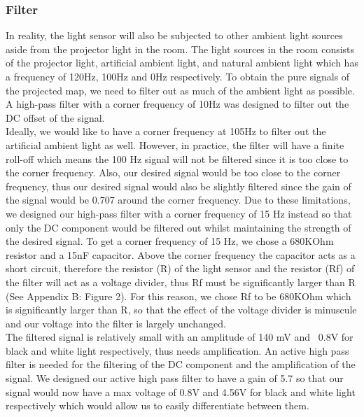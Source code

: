 \subsubsection*{Filter}
In reality, the light sensor will also be subjected to other ambient light sources aside from the projector light in the room. The light sources in the room consists of the projector light, artificial ambient light, and natural ambient light which has a frequency of 120Hz, 100Hz and 0Hz respectively. To obtain the pure signals of the projected map, we need to filter out as much of the ambient light as possible. A high-pass filter with a corner frequency of 10Hz was designed to filter out the DC offset of the signal. 
\\Ideally, we would like to have a corner frequency at 105Hz to filter out the artificial ambient light as well. However, in practice, the filter will have a finite roll-off which means the 100 Hz signal will not be filtered since it is too close to the corner frequency. Also, our desired signal would be too close to the corner frequency, thus our desired signal would also be slightly filtered since the gain of the signal would be 0.707 around the corner frequency. Due to these limitations, we designed our high-pass filter with a corner frequency of 15 Hz instead so that only the DC component would be filtered out whilst maintaining the strength of the desired signal. To get a corner frequency of 15 Hz, we chose a 680KOhm resistor and a 15nF capacitor. Above the corner frequency the capacitor acts as a short circuit, therefore the resistor (R) of the light sensor and the resistor (Rf)  of the filter will act as a voltage divider, thus Rf must be significantly larger than R (See Appendix B: Figure 2). For this reason, we chose Rf to be 680KOhm which is significantly larger than R, so that the effect of the voltage divider is minuscule and our voltage into the filter is largely unchanged. 
\\The filtered signal is relatively small with an amplitude of 140 mV and ~0.8V for black and white light respectively, thus needs amplification. An active high pass filter is needed for the filtering of the DC component and the amplification of the signal. We designed our active high pass filter to have a gain of 5.7 so that our signal would now have a max voltage of 0.8V and 4.56V for black and white light respectively which would allow us to easily differentiate between them. 

